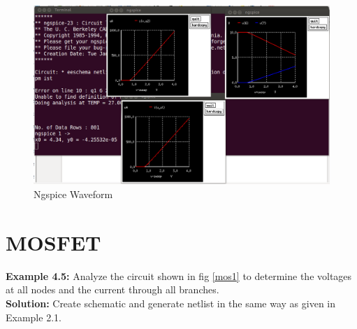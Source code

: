 \begin{figure}
\begin{center}
\includegraphics[width=1\linewidth]{figures/apd18.png}
\caption{Ngspice Waveform}
\label{apd18}
\end{center}
\end{figure}
\section {MOSFET}
\textbf{Example 4.5:} Analyze the circuit shown in fig \ref{mos1} to determine the voltages at all nodes and the current through all branches. \\


\textbf{Solution:} Create schematic and generate netlist in the same way as given in Example 2.1. 
        
